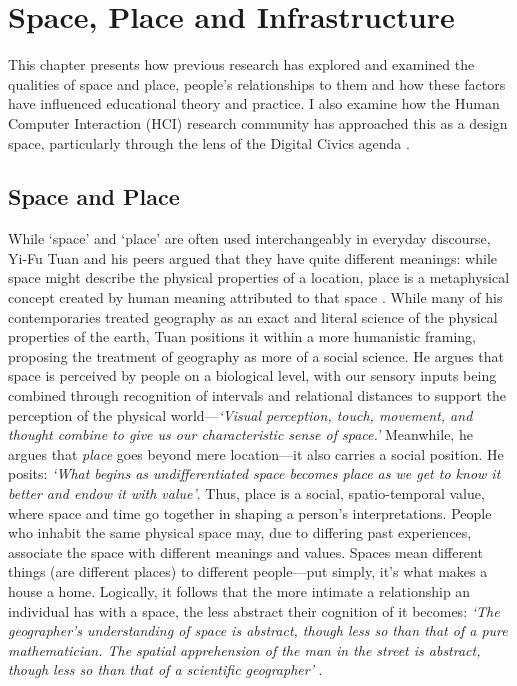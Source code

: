 \chapter{Space, Place and Infrastructure}
\label{chap:SpacePlaceInfrastructure}

This chapter presents how previous research has explored and examined the qualities of space and place, people's relationships to them and how these factors have influenced educational theory and practice. I also examine how the Human Computer Interaction (HCI) research community has approached this as a design space, particularly through the lens of the Digital Civics agenda \citep{Olivier2015}.

\section{Space and Place}
\label{sec:SpaceAndPlace}

While ‘space’ and ‘place’ are often used interchangeably in everyday discourse, Yi-Fu Tuan and his peers argued that they have quite different meanings: while space might describe the physical properties of a location, place is a metaphysical concept created by human meaning attributed to that space \citep{Tuan1978}. While many of his contemporaries treated geography as an exact and literal science of the physical properties of the earth, Tuan positions it within a more humanistic framing, proposing the treatment of geography as more of a social science. He argues that space is perceived by people on a biological level, with our sensory inputs being combined through recognition of intervals and relational distances to support the perception of the physical world---\textit{`Visual perception, touch, movement, and thought combine to give us our characteristic sense of space.'} Meanwhile, he argues that \textit{place} goes beyond mere location---it also carries a social position. He posits: \textit{`What begins as undifferentiated space becomes place as we get to know it better and endow it with value'}. Thus, place is a social, spatio-temporal value, where space and time go together in shaping a person's interpretations. People who inhabit the same physical space may, due to differing past experiences, associate the space with different meanings and values. Spaces mean different things (are different places) to different people---put simply, it's what makes a house a home. Logically, it follows that the more intimate a relationship an individual has with a space, the less abstract their cognition of it becomes: \textit{`The geographer's understanding of space is abstract, though less so than that of a pure mathematician. The spatial apprehension of the man in the street is abstract, though less so than that of a scientific geographer'} \citep{Tuan1978}.

